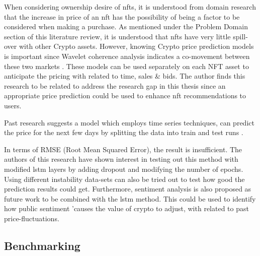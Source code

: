 


\bigbreak

When considering ownership desire of \gls{nft}s, it is understood from domain research that the increase in price of an \gls{nft} has the possibility of being a factor to be considered when making a purchase.
As mentioned under the Problem Domain section of this literature review, it is understood that \gls{nft}s have very little spill-over with other Crypto assets. However, knowing Crypto price prediction models is important since Wavelet coherence analysis indicates a co-movement between these two markets \autocite{dowling_is_2021}.
These models can be used separately on each NFT asset to anticipate the pricing with related to time, sales \& bids.
The author finds this research to be related to address the research gap in this thesis since an appropriate price prediction could be used to enhance \Gls{nft}  recommendations to users.

Past research suggests a model which employs time series techniques, can predict the price for the next few days by splitting the data into train and test runs \autocite{ferdiansyah_lstm-method_2019}.

In terms of RMSE (Root Mean Squared Error), the result is insufficient. The authors of this research have shown interest in testing out this method with modified \gls{lstm} layers by adding dropout and modifying the number of epochs. Using different instability data-sets can also be tried out to test how good the prediction results could get. 
Furthermore, sentiment analysis is also proposed as future work to be combined with the \gls{lstm} method. This could be used to identify how public sentiment 'causes the value of crypto to adjust, with related to past price-fluctuations.


\subsection{Benchmarking}



